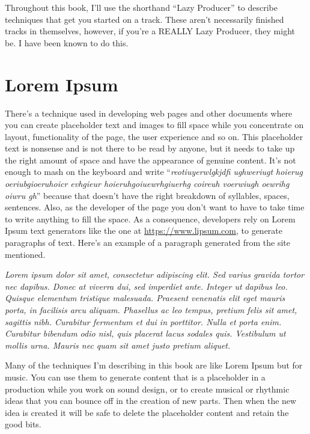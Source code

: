 \documentclass[
  12pt,
  letterpaper,
  oneside,
  open=any]{scrbook}
\begin{document}
Throughout this book, I'll use the shorthand ``Lazy Producer'' to
describe techniques that get you started on a track. These aren't
necessarily finished tracks in themselves, however, if you're a REALLY
Lazy Producer, they might be. I have been known to do this.

\section*{Lorem Ipsum}\label{lorem-ipsum}


There's a technique used in developing web pages and other documents
where you can create placeholder text and images to fill space while you
concentrate on layout, functionality of the page, the user experience
and so on. This placeholder text is nonsense and is not there to be read
by anyone, but it needs to take up the right amount of space and have
the appearance of genuine content. It's not enough to mash on the
keyboard and write ``\emph{reotiuyerwlgkjdfi ughweriugt hoierug
oeriubgioeruhoicr evhgieur hoieruhgoiuewrhgiuerhg coireuh voerwiugh
oewrihg oiwru gh}'' because that doesn't have the right breakdown of
syllables, spaces, sentences. Also, as the developer of the page you
don't want to have to take time to write anything to fill the space. As
a consequence, developers rely on Lorem Ipsum text generators like the
one at \url{https://www.lipsum.com}, to generate paragraphs of text.
Here's an example of a paragraph generated from the site mentioned.

\emph{Lorem ipsum dolor sit amet, consectetur adipiscing elit. Sed
varius gravida tortor nec dapibus. Donec at viverra dui, sed imperdiet
ante. Integer ut dapibus leo. Quisque elementum tristique malesuada.
Praesent venenatis elit eget mauris porta, in facilisis arcu aliquam.
Phasellus ac leo tempus, pretium felis sit amet, sagittis nibh.
Curabitur fermentum et dui in porttitor. Nulla et porta enim. Curabitur
bibendum odio nisl, quis placerat lacus sodales quis. Vestibulum ut
mollis urna. Mauris nec quam sit amet justo pretium aliquet.}

Many of the techniques I'm describing in this book are like Lorem Ipsum
but for music. You can use them to generate content that is a
placeholder in a production while you work on sound design, or to create
musical or rhythmic ideas that you can bounce off in the creation of new
parts. Then when the new idea is created it will be safe to delete the
placeholder content and retain the good bits.
\end{document}
